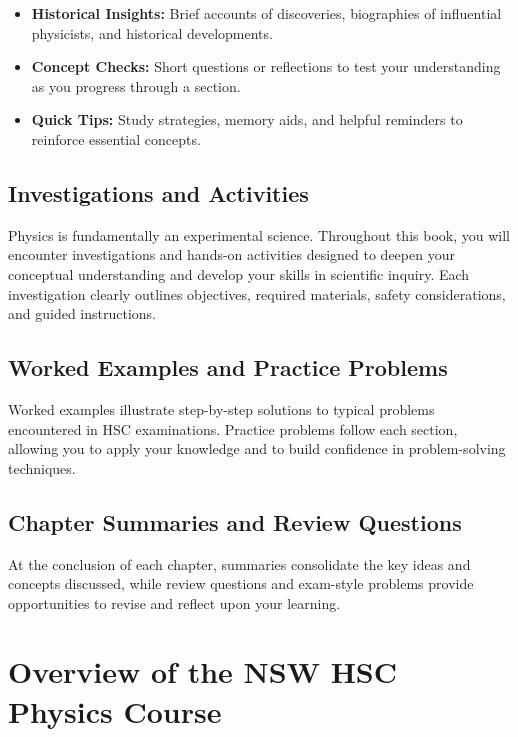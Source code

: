 \begin{itemize}
\item \textbf{Historical Insights:} Brief accounts of discoveries, biographies of influential physicists, and historical developments.
\item \textbf{Concept Checks:} Short questions or reflections to test your understanding as you progress through a section.
\item \textbf{Quick Tips:} Study strategies, memory aids, and helpful reminders to reinforce essential concepts.
\end{itemize}

\subsection{Investigations and Activities}
\FloatBarrier

Physics is fundamentally an experimental science. Throughout this book, you will encounter investigations and hands-on activities designed to deepen your conceptual understanding and develop your skills in scientific inquiry. Each investigation clearly outlines objectives, required materials, safety considerations, and guided instructions.

\subsection{Worked Examples and Practice Problems}
\FloatBarrier

Worked examples illustrate step-by-step solutions to typical problems encountered in HSC examinations. Practice problems follow each section, allowing you to apply your knowledge and to build confidence in problem-solving techniques.

\subsection{Chapter Summaries and Review Questions}
\FloatBarrier

At the conclusion of each chapter, summaries consolidate the key ideas and concepts discussed, while review questions and exam-style problems provide opportunities to revise and reflect upon your learning.

\section{Overview of the NSW HSC Physics Course}
\FloatBarrier

